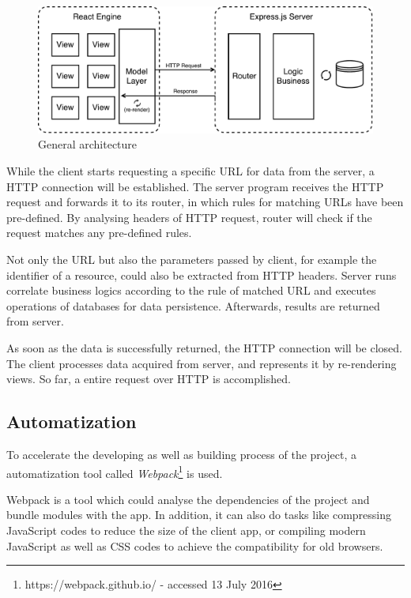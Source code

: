 \begin{figure}[!htbp]
  \centering
    \includegraphics[width=1\textwidth]{Figures/imp-general-arch.pdf}
  \caption{General architecture}
  \label{fig:general-arch-imp}
\end{figure}
While the client starts requesting a specific URL for data from the server, a HTTP connection will be established. The server program receives the HTTP request and forwards it to its router, in which rules for matching URLs have been pre-defined. By analysing headers of HTTP request, router will check if the request matches any pre-defined rules.

Not only the URL but also the parameters passed by client, for example the identifier of a resource, could also be extracted from HTTP headers. Server runs correlate business logics according to the rule of matched URL and executes operations of databases for data persistence. Afterwards, results are returned from server.

As soon as the data is successfully returned, the HTTP connection will be closed. The client processes data acquired from server, and represents it by re-rendering views. So far, a entire request over HTTP is accomplished.

\subsection{Automatization}
To accelerate the developing as well as building process of the project, a automatization tool called \textit{Webpack}\footnote{https://webpack.github.io/ - accessed 13 July 2016} is used. 

Webpack is a tool which could analyse the dependencies of the project and bundle modules with the app. In addition, it can also do tasks like compressing JavaScript codes to reduce the size of the client app, or compiling modern JavaScript as well as CSS codes to achieve the compatibility for old browsers.

